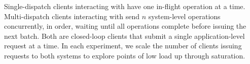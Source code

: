 Single-dispatch clients interacting with \mpaxos{} have one in-flight operation at
a time. Multi-dispatch clients interacting with \system{} send $n$ system-level
operations concurrently, in order, waiting until all operations complete before
issuing the next batch. Both are closed-loop clients that submit a single
application-level request at a time.
In each experiment, we scale the number of clients issuing requests to both
systems to explore points of low load up through saturation.




%


